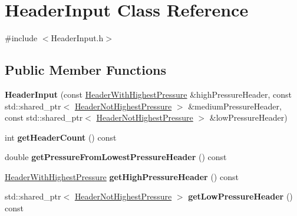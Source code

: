 \hypertarget{class_header_input}{}\section{Header\+Input Class Reference}
\label{class_header_input}


{\ttfamily \#include $<$Header\+Input.\+h$>$}

\subsection*{Public Member Functions}
\begin{DoxyCompactItemize}
\item 
\mbox{\label{class_header_input_a52a39183b1823fcb57347f607967cf64}} 
{\bfseries Header\+Input} (const \hyperlink{class_header_with_highest_pressure}{Header\+With\+Highest\+Pressure} \&high\+Pressure\+Header, const std\+::shared\+\_\+ptr$<$ \hyperlink{class_header_not_highest_pressure}{Header\+Not\+Highest\+Pressure} $>$ \&medium\+Pressure\+Header, const std\+::shared\+\_\+ptr$<$ \hyperlink{class_header_not_highest_pressure}{Header\+Not\+Highest\+Pressure} $>$ \&low\+Pressure\+Header)
\item 
\mbox{\label{class_header_input_a45e461a0eca1df691fe13f6f9b1968fe}} 
int {\bfseries get\+Header\+Count} () const
\item 
\mbox{\label{class_header_input_a820d9ed7adc49098eeca8af3694f91ee}} 
double {\bfseries get\+Pressure\+From\+Lowest\+Pressure\+Header} () const
\item 
\mbox{\label{class_header_input_a298d0336874b64566c6abdc05639df20}} 
\hyperlink{class_header_with_highest_pressure}{Header\+With\+Highest\+Pressure} {\bfseries get\+High\+Pressure\+Header} () const
\item 
\mbox{\label{class_header_input_aac2c12b790702b925283e9ea28d3fa9c}} 
std\+::shared\+\_\+ptr$<$ \hyperlink{class_header_not_highest_pressure}{Header\+Not\+Highest\+Pressure} $>$ {\bfseries get\+Low\+Pressure\+Header} () const
\item 
\mbox{\label{class_header_input_a9371cf50cb4b29655412cba09b34338f}} 

\end{DoxyCompactItemize}
